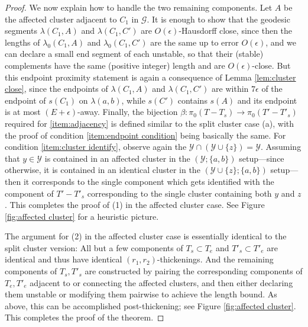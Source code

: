 \documentclass[10pt,a4paper]{amsart}
\newcommand{\calG}{\mathcal{G}}
\newcommand{\calY}{\mathcal{Y}}
\begin{document}
\begin{proof}
We now explain how to handle the two remaining components.  Let $A$ be the affected cluster adjacent to $C_1$ in $\calG$.  It is enough to show that the geodesic segments $\lambda(C_1,A)$ and $\lambda(C_1,C')$ are $O(\epsilon)$-Hausdorff close, since then the lengths of $\lambda_0(C_1,A)$ and $\lambda_0(C_1,C')$ are the same up to error $O(\epsilon)$, and we can declare a small end segment of each unstable, so that their (stable) complements have the same (positive integer) length and are $O(\epsilon)$-close.  But this endpoint proximity statement is again a consequence of Lemma \ref{lem:cluster close}, since the endpoints of $\lambda(C_1,A)$ and $\lambda(C_1,C')$ are within $7\epsilon$ of the endpoint of $s(C_1)$ on $\lambda(a,b)$, while $s(C')$ contains $s(A)$ and its endpoint is at most $(E+\epsilon)$-away.  Finally, the bijection $\beta:\pi_0(T-T_s) \to \pi_0(T'-T'_s)$ required for \eqref{item:adjacency} is defined similar to the split cluster case (a), with the proof of condition \eqref{item:endpoint condition} being basically the same.  For condition \eqref{item:cluster identify}, observe again the $\calY \cap (\calY \cup \{z\}) = \calY$.  Assuming that $y \in \calY$ is contained in an affected cluster in the $(\calY; \{a,b\})$ setup---since otherwise, it is contained in an identical cluster in the $(\calY \cup \{z\};\{a,b\})$ setup---then it corresponds to the single component which gets identified with the component of $T'- T'_s$ corresponding to the single cluster containing both $y$ and $z$.  This completes the proof of (1) in the affected cluster case.  See Figure \ref{fig:affected cluster} for a heuristic picture.

The argument for (2) in the affected cluster case is essentially identical to the split cluster version: All but a few components of $T_s \subset T_e$ and $T'_s \subset T'_e$ are identical and thus have identical $(r_1,r_2)$-thickenings.  And the remaining components of $T_s, T'_s$ are constructed by pairing the corresponding components of $T_e, T'_e$ adjacent to or connecting the affected clusters, and then either declaring them unstable or modifying them pairwise to achieve the length bound.  As above, this can be accomplished post-thickening; see Figure \ref{fig:affected cluster}.  This completes the proof of the theorem.

\end{proof}
\end{document}
